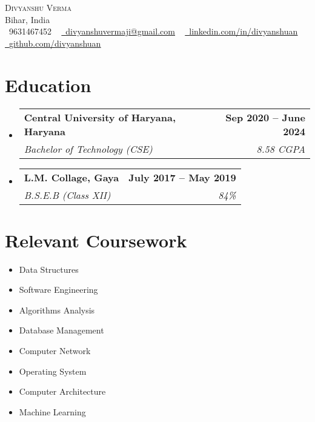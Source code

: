 \documentclass[letterpaper,11pt]{article}
\makeatletter
\newcommand{\resumeSubheading}[4]{
  \vspace{-2pt}\item
    \begin{tabular*}{1.0\textwidth}[t]{l@{\extracolsep{\fill}}r}
      \textbf{#1} & \textbf{\small #2} \\
      \textit{\small#3} & \textit{\small #4} \\
    \end{tabular*}\vspace{-7pt}
}
\newcommand{\resumeSubHeadingListStart}{\begin{itemize}[leftmargin=0.0in, label={}]}
\newcommand{\resumeSubHeadingListEnd}{\end{itemize}}
\makeatother
\begin{document}

\begin{center}
    {\Huge \scshape Divyanshu Verma} \\ \vspace{1pt}
    Bihar, India  \\ \vspace{1pt}
    \small \raisebox{-0.1\height}\faPhone\ 9631467452 ~ \href{mailto:divyanshuvermaji@gmail.com}{\raisebox{-0.2\height}\faEnvelope\  \underline{divyanshuvermaji@gmail.com}} ~ 
    \href{https://www.linkedin.com/in/divyanshuan/}{\raisebox{-0.2\height}\faLinkedin\ \underline{linkedin.com/in/divyanshuan}}  ~
    \href{https://github.com/divyanshuan}{\raisebox{-0.2\height}\faGithub\ \underline{github.com/divyanshuan}}
    \vspace{-8pt}
\end{center}


\section{Education}
  \resumeSubHeadingListStart
    \resumeSubheading
      {Central University of Haryana, Haryana}{Sep 2020 -- June 2024}
      {Bachelor of Technology (CSE)}{8.58 CGPA}
    \resumeSubheading
      {L.M. Collage, Gaya}{July 2017 -- May 2019}
      {B.S.E.B (Class XII)}{84\% }
  \resumeSubHeadingListEnd


\section{Relevant Coursework}
        \begin{multicols}{4}
            \begin{itemize}[itemsep=-5pt, parsep=3pt]
                \item\small Data Structures
                \item Software Engineering
                \item Algorithms Analysis
                \item Database Management
                \item Computer Network
                \item Operating System
                \item Computer Architecture
                \item Machine Learning
            \end{itemize}
        \end{multicols}
        \vspace*{2.0\multicolsep}
    
\end{document}
